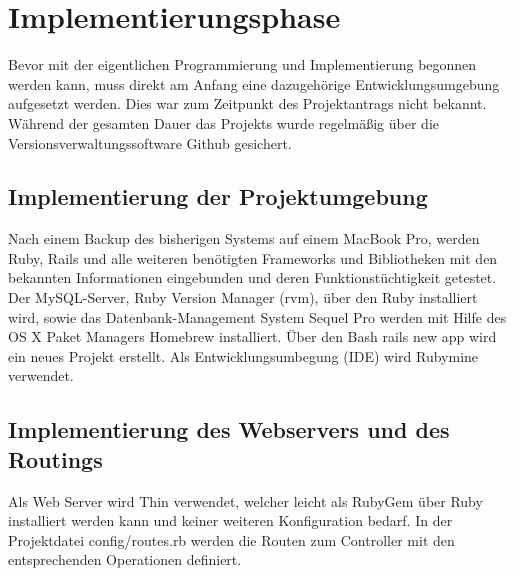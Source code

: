 \section{Implementierungsphase} 
\label{sec:Implementierungsphase}
Bevor mit der eigentlichen Programmierung und Implementierung begonnen werden kann, muss direkt am Anfang eine dazugehörige Entwicklungsumgebung aufgesetzt werden. Dies war zum Zeitpunkt des Projektantrags nicht bekannt. 
Während der gesamten Dauer das Projekts wurde regelmäßig über die Versionsverwaltungssoftware Github gesichert.

\subsection{Implementierung der Projektumgebung}
\label{subsec:ImplementierungDatenstruktur}
Nach einem Backup des bisherigen Systems auf einem MacBook Pro, werden Ruby, Rails und alle weiteren benötigten Frameworks und Bibliotheken mit den bekannten Informationen eingebunden und deren Funktionstüchtigkeit getestet. Der MySQL-Server, Ruby Version Manager (rvm), über den Ruby installiert wird, sowie das Datenbank-Management System Sequel Pro werden mit Hilfe des OS X Paket Managers Homebrew installiert. Über den Bash rails new app wird ein neues Projekt erstellt. Als Entwicklungsumbegung (IDE) wird Rubymine verwendet.


\subsection{Implementierung des Webservers und des Routings}
\label{subsec:ImplementierungBenutzeroberfläche}
Als Web Server wird Thin verwendet, welcher leicht als RubyGem über Ruby installiert werden kann und keiner weiteren Konfiguration bedarf. In der Projektdatei config/routes.rb werden die Routen zum Controller mit den entsprechenden Operationen definiert.

